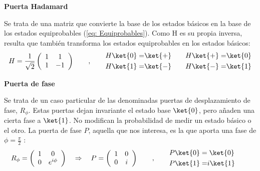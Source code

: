 \documentclass[11pt,a4paper,twoside,pdf]{article}
\numberwithin{equation}{section}
\begin{document}
		\begin{flushleft}{\textbf{Puerta Hadamard}}\end{flushleft}
			
			Se trata de una matriz que convierte la base de los estados básicos en la base de los estados equiprobables (\ref{eq: Equiprobables}). Como H es su propia inversa, resulta que también transforma los estados equiprobables en los estados básicos:
				\begin{equation}\label{eq: Hadamard}
					H = \frac{1}{\sqrt{2}}\left(\begin{array}{cc}1 &  1\\1 & -1\end{array}\right)		\qquad , \qquad
					\begin{aligned}H\ket{0} =& \ket{+}\\H\ket{1}=& \ket{-}\end{aligned}	\qquad
					\begin{aligned}H\ket{+}=& \ket{0}\\H\ket{-}=& \ket{1}\end{aligned}
				\end{equation}	
			
		\begin{flushleft}{\textbf{Puerta de fase}}\end{flushleft}	
			
			Se trata de un caso particular de las denominadas puertas de desplazamiento de fase, $R_{\phi}$. Estas puertas dejan invariante el estado base $\ket{0}$, pero añaden una cierta fase a $\ket{1}$. No modifican la probabilidad de medir un estado básico o el otro.
			La puerta de fase $P$, aquella que nos interesa, es la que aporta una fase de $\phi=\frac{\pi}{2}$ :
				\begin{equation}\label{eq: Fase}
					R_{\phi} = \left(\begin{array}{cc}1 &  0\\0 & e^{i\phi}\end{array}\right)	\quad \Rightarrow \quad
					P = \left(\begin{array}{cc}1 &  0\\0 & i\end{array}\right)				 \qquad , \qquad
					\begin{aligned} P\ket{0}=& \; \ket{0} \\ P\ket{1}=& i\ket{1}\end{aligned} \qquad
				\end{equation}		
				
\end{document}
